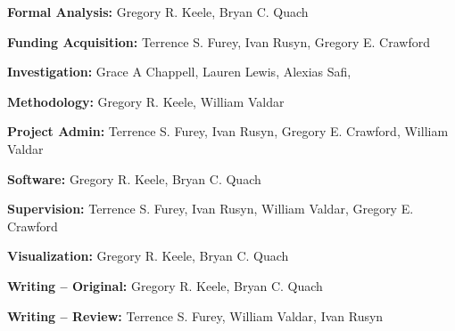 \documentclass[10pt,letterpaper]{article}
\begin{document}
\noindent \textbf{Formal Analysis:} Gregory R. Keele, Bryan C. Quach

\noindent \textbf{Funding Acquisition:} Terrence S. Furey, Ivan Rusyn, Gregory E. Crawford

\noindent \textbf{Investigation:} Grace A Chappell, Lauren Lewis, Alexias Safi,

\noindent \textbf{Methodology:} Gregory R. Keele, William Valdar

\noindent \textbf{Project Admin:} Terrence S. Furey, Ivan Rusyn, Gregory E. Crawford, William Valdar

\noindent \textbf{Software:} Gregory R. Keele, Bryan C. Quach

\noindent \textbf{Supervision:} Terrence S. Furey, Ivan Rusyn, William Valdar, Gregory E. Crawford

\noindent \textbf{Visualization:} Gregory R. Keele, Bryan C. Quach

\noindent \textbf{Writing – Original:} Gregory R. Keele, Bryan C. Quach

\noindent \textbf{Writing – Review:} Terrence S. Furey, William Valdar, Ivan Rusyn
 
\nolinenumbers

%
%
% 
%
\end{document}
